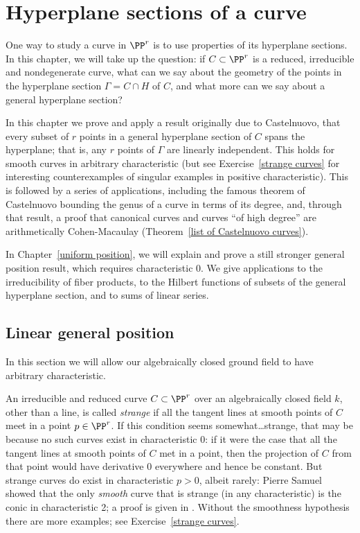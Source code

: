 


\chapter{Hyperplane sections of a curve}\label{linear general position chapter}

One way to study a curve in $\PP^r$ is to use properties of its hyperplane sections. In this chapter, we will take up the question: if $C \subset \PP^r$ is a reduced, irreducible and nondegenerate curve, what can we say about the geometry of the points in the  hyperplane section $\Gamma = C \cap H$ of $C$, and what more can we say about a general hyperplane section?

In this chapter we prove and apply a result originally due to Castelnuovo, that every subset of $r$ points in a
general hyperplane section of $C$ spans the hyperplane; that is, any $r$ points of $\Gamma$ are linearly independent. This 
holds for smooth curves in arbitrary characteristic (but see Exercise~\ref{strange curves} for
interesting counterexamples of singular examples in positive characteristic). This is followed by a series of applications,
including the famous theorem of Castelnuovo bounding the genus of a curve in terms of its degree,
and, through that result, a proof that canonical curves and curves ``of high degree'' are arithmetically Cohen-Macaulay (Theorem~\ref{list of Castelnuovo curves}).

In Chapter~\ref{uniform position}, we will explain and prove a still stronger general position result, which requires characteristic 0. We give applications to the irreducibility of fiber products, to the Hilbert functions of subsets of the
general hyperplane section, and to sums of linear series.


\section{Linear general position}\label{linearly general position section}
In this section we will allow our algebraically closed ground field to have arbitrary characteristic. 

An irreducible and reduced curve
$C\subset \PP^r$ over an algebraically closed field $k$, other than a line, is called \emph{strange} if
all the tangent lines at smooth points of $C$ meet in a point $p\in \PP^r$. If this condition seems somewhat\dots strange, that may be because no such curves exist in characteristic 0: if it were the case that all the tangent lines at smooth points of $C$ met in a point, then the projection of $C$ from that point would have derivative 0 everywhere and hence be constant. But strange curves do exist in characteristic $p > 0$, albeit rarely: Pierre Samuel showed that the only \emph{smooth} curve that is strange (in any characteristic) is the conic in characteristic 2; a proof is given in \cite[Theorem IV.3.9]{Hartshorne1977}. Without the smoothness hypothesis there are more examples; see Exercise~\ref{strange curves}.


